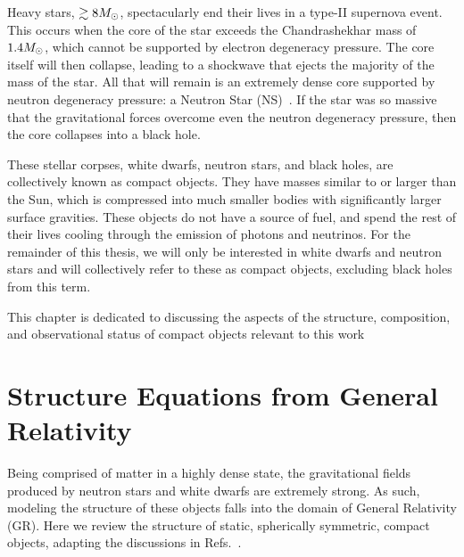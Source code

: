 Heavy stars, $\gtrsim 8M_\odot$, spectacularly end their lives in a type-II supernova event. This occurs when the core of the star exceeds the Chandrashekhar mass of $1.4M_\odot$, which cannot be supported by electron degeneracy pressure. The core itself will then collapse, leading to a shockwave that ejects the majority of the mass of the star. All that will remain is an extremely dense core supported by neutron degeneracy pressure: a Neutron Star (NS)~\cite{Woosley:2005cha_PhysicsCoreCollapseSupernovae}. If the star was so massive that the gravitational forces overcome even the neutron degeneracy pressure, then the core collapses into a black hole. 

These stellar corpses, white dwarfs, neutron stars, and black holes, are collectively known as compact objects. They have masses similar to or larger than the Sun, which is compressed into much smaller bodies with significantly larger surface gravities. These objects do not have a source of fuel, and spend the rest of their lives cooling through the emission of photons and neutrinos. For the remainder of this thesis, we will only be interested in white dwarfs and neutron stars and will collectively refer to these as compact objects, excluding black holes from this term. 

This chapter is dedicated to discussing the aspects of the structure, composition, and observational status of compact objects relevant to this work

\section{Structure Equations from General Relativity}
\label{ch2:sec:CO_general_structure}

Being comprised of matter in a highly dense state, the gravitational fields produced by neutron stars and white dwarfs are extremely strong.
As such, modeling the structure of these objects falls into the domain of General Relativity (GR). Here we review the structure of static, spherically symmetric, compact objects, adapting the discussions in Refs.~\cite{Shapiro_Blackholeswhite, Misner_Gravitation, Schutz_Firstcoursegeneral}. 

